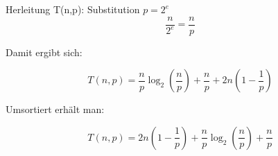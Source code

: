 {\begin{frame}{Herleitung T(n,p): Substitution $p = 2^e$}
        \[
            \frac{n}{2^e} = \frac{n}{p}
        \]

        Damit ergibt sich:

        \[
            T(n,p)
            =
            \frac{n}{p}
            \log_2\!\left(\frac{n}{p}\right)
            +
            \frac{n}{p}
            +
            2n\left(1-\frac1{p}\right)
        \]

        Umsortiert erhält man:

        \[
            T(n,p)
            =
            2n\left(1-\frac1{p}\right)
            +
            \frac{n}{p}\log_2\!\left(\frac{n}{p}\right)
            +
            \frac{n}{p}
        \]

    \end{frame}
}

\newcommand{\alleFolien}{
    \HerleitungTnp
    \section*{Binärbaum}
    \begin{frame}{Balancierter Binärbaum für $n = 16$}
        \BalancierterBinaerbaumNSechzehn
    \end{frame}

    \begin{frame}{Balancierter Binärbaum für $n = 16$, $p=4$, $e=2$}

        \centering
        \begin{tikzpicture}[
                level distance=1.2cm,
                every node/.style={circle,draw,minimum size=6mm},
                level 1/.style={sibling distance=6cm},
                level 2/.style={sibling distance=3cm},
                level 3/.style={sibling distance=1.5cm},
                level 4/.style={sibling distance=0.75cm}
            ]


\end{tikzpicture}
\end{frame}}
